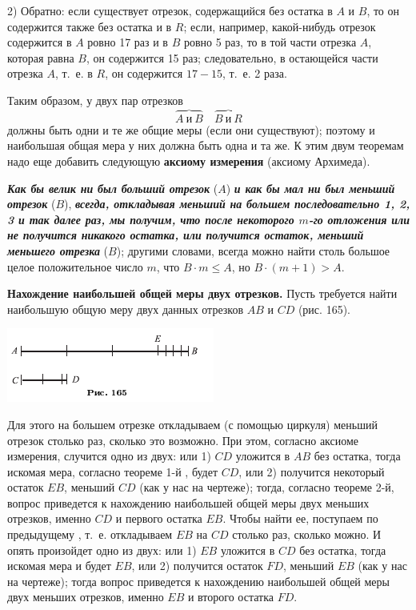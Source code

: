 \documentclass[oneside]{book}
\begin{document}
2) Обратно:
если существует отрезок, содержащийся без остатка в $A$ и $B$, то он содержится также без остатка и в $R$;
если, например, какой-нибудь отрезок содержится в $A$ ровно 17 раз и в $B$ ровно 5 раз, то в той части отрезка $A$, которая равна $B$, он содержится 15 раз;
следовательно, в остающейся части отрезка $A$, т.~е. в $R$, он содержится $17-15$, т.~е. 2 раза.

Таким образом, у двух пар отрезков
\[\overbrace{A\ \text{и}\ B}\quad \overbrace{B\ \text{и}\ R}\]
должны быть одни и те же общие меры (если они существуют);
поэтому и наибольшая общая мера у них должна быть одна и та же.
К этим двум теоремам надо еще добавить следующую \textbf{аксиому измерения} (аксиому Архимеда).

\textbf{\emph{Как бы велик ни был больший отрезок}} ($A$) \textbf{\emph{и как бы мал ни был меньший отрезок}} ($B$), \textbf{\emph{всегда, откладывая меньший на большем последовательно 1, 2, 3 и так далее раз, мы получим, что после некоторого $m$-го отложения или не получится никакого остатка, или получится остаток, меньший меньшего отрезка}} ($B$);
другими словами, всегда можно найти столь большое целое положительное число $m$, что $B \cdot  m \le A$, но $B \cdot  (m + 1) > A$.

\textbf{Нахождение наибольшей общей меры двух отрезков.}
Пусть требуется найти наибольшую общую меру двух данных отрезков $AB$ и $CD$ (рис. 165).

\includegraphics{pics/ris-165}

Для этого на большем отрезке откладываем (с помощью циркуля) меньший отрезок столько раз, сколько это возможно.
При этом, согласно аксиоме измерения, случится одно из двух:
или 
1) $CD$ уложится в $AB$ без остатка, тогда искомая мера, согласно теореме 1-й%
, будет $CD$, 
или 2) получится некоторый остаток $EB$, меньший $CD$ (как у нас на чертеже);
тогда, согласно теореме 2-й, вопрос приведется к нахождению наибольшей общей меры двух меньших отрезков, именно $CD$ и первого остатка $EB$.
Чтобы найти ее, поступаем по предыдущему%
, т.~е. откладываем $EB$ на $CD$ столько раз, сколько можно.
И опять произойдет одно из двух:
или 1) $EB$ уложится в $CD$ без остатка, тогда искомая мера и будет $EB$, 
или 2) получится остаток $FD$, меньший $EB$ (как у нас на чертеже);
тогда вопрос приведется к нахождению наибольшей общей меры двух меньших отрезков, именно $EB$ и второго остатка $FD$.
\end{document}
